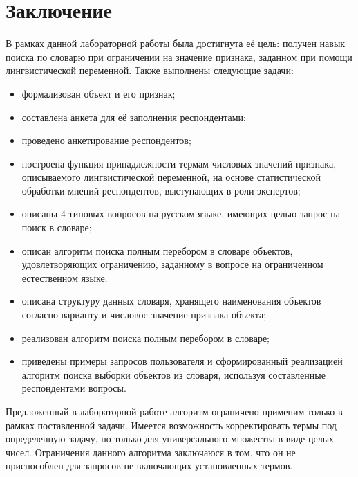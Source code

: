 \section*{\large Заключение}
    \par В рамках данной лабораторной работы была достигнута её цель: получен навык поиска по словарю при ограничении на значение признака, заданном при помощи лингвистической переменной. Также выполнены следующие задачи:
    \begin{itemize}
    	\item формализован объект и его признак;
		\item составлена анкета для её заполнения респондентами;
		\item проведено анкетирование респондентов;
		\item построена функция принадлежности термам числовых значений признака, описываемого лингвистической переменной, на основе статистической обработки мнений респондентов, выступающих в роли экспертов;
		\item описаны 4 типовых вопросов на русском языке, имеющих целью запрос на поиск в словаре;
		\item описан алгоритм поиска полным перебором в словаре объектов, удовлетворяющих ограничению, заданному в вопросе на ограниченном естественном языке;
		\item описана структуру данных словаря, хранящего наименования объектов согласно варианту и числовое значение признака объекта;
		\item реализован алгоритм поиска полным перебором в словаре;
		\item приведены примеры запросов пользователя и сформированный реализацией алгоритм поиска выборки объектов из словаря, используя составленные респондентами вопросы.
	\end{itemize}
	\par Предложенный в лабораторной работе алгоритм ограничено применим только в рамках поставленной задачи. Имеется возможность корректировать термы под определенную задачу, но только для универсального множества в виде целых чисел. Ограничения данного алгоритма заключаюся в том, что он не приспособлен для запросов не включающих установленных термов.
\newpage
